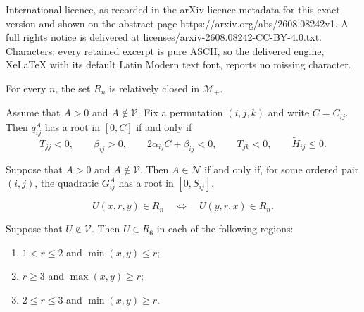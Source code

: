\documentclass[10pt,a4paper]{amsart}
\newcommand{\NH}{\mathcal N}
\newcommand{\V}{\mathcal V}
\begin{document}
International licence, as recorded in the arXiv licence metadata for this exact version and shown on the abstract page https://arxiv.org/abs/2608.08242v1. A full rights notice is delivered at licenses/arxiv-2608.08242-CC-BY-4.0.txt. Characters: every retained excerpt is pure ASCII, so the delivered engine, XeLaTeX with its default Latin Modern text font, reports no missing character.
\begin{proposition}
\label{prop:Rn-relatively-closed}
For every $n$, the set $R_n$ is relatively closed in $\mathcal M_+$.
\end{proposition}

\begin{proposition}
\label{prop:reduced-Frydman-test}
Assume that $A>0$ and $A\notin\V$.  Fix a permutation $(i,j,k)$ and
write $C=C_{ij}$.  Then $q_{ij}^A$ has a root in $[0,C]$ if and only if
\[
T_{jj}<0,
\qquad
\beta_{ij}>0,
\qquad
2\alpha_{ij}C+\beta_{ij}<0,
\qquad
T_{jk}<0,\qquad \widetilde H_{ij}\leq0.
\]
\end{proposition}

\begin{proposition}
	\label{prop:last-move-quadratic-criterion}
	Suppose that \(A>0\) and \(A\notin\V\). Then \(A\in\NH\) if and only
	if, for some ordered pair \((i,j)\), the quadratic \(G_{ij}^A\) has a
	root in \([0,S_{ij}]\).
\end{proposition}

\begin{equation}\label{bysymmetry}
U(x,r,y)\in R_n
\quad\Longleftrightarrow\quad
U(y,r,x)\in R_n.
\end{equation}

\begin{lemma}
\label{lem:R6-elimination}
Suppose that $U\notin\V$.  Then $U\in R_6$ in each of the following
regions:
\begin{enumerate}[(1)]
\item $1<r\leq2$ and $\min(x,y)\leq r$;
\item $r\geq3$ and $\max(x,y)\geq r$;
\item $2\leq r\leq3$ and $\min(x,y)\geq r$.
\end{enumerate}
\end{lemma}
\end{document}
